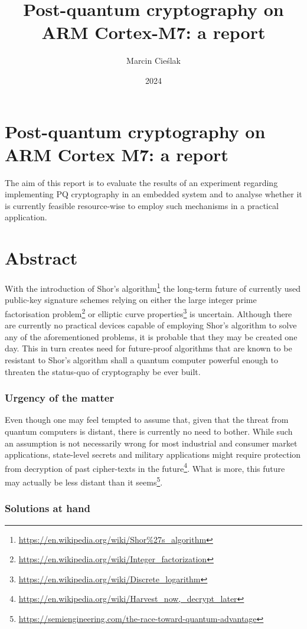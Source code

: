 \documentclass[
]{article}
\author{Marcin Cieślak}
\date{2024}
\title{Post-quantum cryptography on ARM Cortex-M7: a report}
\begin{document}
\hypertarget{title}{%
\part{Post-quantum cryptography on ARM Cortex M7: a report}
\label{title}}

The aim of this report is to evaluate the results of an experiment regarding implementing PQ cryptography
in an embedded system and to analyse whether it is currently feasible resource-wise to employ such mechanisms in a practical application.

\hypertarget{abstract}{%
\part{Abstract}
\label{abstract}}

With the introduction of Shor's algorithm\footnote{\url{https://en.wikipedia.org/wiki/Shor\%27s_algorithm}}
the long-term future of currently used public-key signature schemes relying on either the large integer prime factorisation problem\footnote{\url{https://en.wikipedia.org/wiki/Integer_factorization}} or
elliptic curve properties\footnote{\url{https://en.wikipedia.org/wiki/Discrete_logarithm}} is uncertain.
Although there are currently no practical devices capable of employing
Shor's algorithm to solve any of the aforementioned problems, it is probable that they may be created one day.
This in turn creates need for future-proof algorithms that are known to be resistant to Shor's algorithm shall a quantum computer powerful enough to threaten the status-quo of cryptography be ever built.

\hypertarget{urgency}{%
\section{Urgency of the matter}\label{urgency}}

Even though one may feel tempted to assume that, given that the threat from quantum computers is distant,
there is currently no need to bother. While such an assumption is not necessarily wrong for most
industrial and consumer market applications, state-level secrets and military applications might require
protection from decryption of past cipher-texts in the future\footnote{\url{https://en.wikipedia.org/wiki/Harvest_now,_decrypt_later}}.
What is more, this future may actually be less distant than it seems\footnote{\url{https://semiengineering.com/the-race-toward-quantum-advantage}}.

\hypertarget{possible-resolutions}{%
\section{Solutions at hand}\label{possible-resolutions}}
\end{document}
